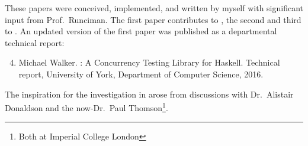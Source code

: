 These papers were conceived, implemented, and written by myself with
significant input from Prof.~Runciman.  The first paper contributes to
, the second and third to .  An
updated version of the first paper was published as a departmental
technical report:

\begin{enumerate}
\setcounter{enumi}{3}
\item Michael Walker. \dejafu{}: A Concurrency Testing Library for
  Haskell.  Technical report, University of York, Department of
  Computer Science, 2016.\nocite{YCS-2016-503}
\end{enumerate}

The inspiration for the investigation in  arose
from discussions with Dr.~Alistair Donaldson and the now-Dr.~Paul
Thomson\footnote{Both at Imperial College London}.
